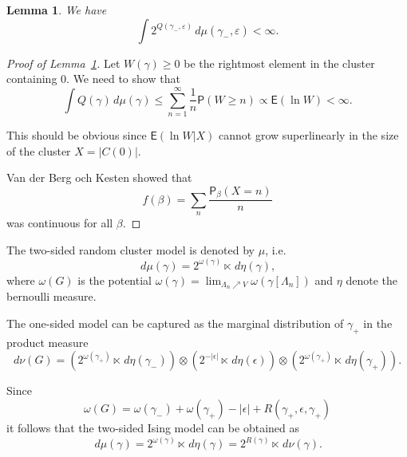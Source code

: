 \documentclass[11pt, a4paper, oneside]{article}
\newtheorem{lemma}[thm]{Lemma}
\theoremstyle{definition}
\theoremstyle{remark}
\renewcommand{\d}{\,d}
\providecommand{\E}{\mathsf{E}}
\renewcommand{\P}{\mathsf{P}}
\providecommand{\e}{\epsilon}
\providecommand{\g}{\gamma}
\providecommand{\w}{\omega}
\def\e{\varepsilon}
\begin{document}
\begin{lemma}\label{lem:Qintegrable}
  We have
  \[
    \int 2^{Q(\g_-,\e)} \d\mu(\g_-,\e) < \infty.
  \]
\end{lemma}
\begin{proof}[Proof of Lemma~\ref{lem:Qintegrable}]

  Let $W(\g)\ge 0$ be the rightmost element in the cluster containing $0$. We
  need to show that
  \[
    \int Q(\g) \d\mu(\g) \le \sum_{n=1}^\infty \frac 1n \P(W\ge n) \propto \E(\ln W ) < \infty.
  \]

  This should be obvious since $\E(\ln W|X)$ cannot grow superlinearly in the
  size of the cluster $X=|C(0)|$.

  Van der Berg och Kesten showed that
  \[
    f(\beta) = \sum_{n} \frac{\P_\beta(X=n)}{n}
  \]
  was continuous for all $\beta$.

\end{proof}






The two-sided random cluster model is denoted by $\mu$, i.e.\
$$ \d\mu(\g) = 2^{\w(\g)} \ltimes \d\eta(\g), $$
where $\w(G)$ is the potential
$\w(\g) = \lim_{\Lambda_n\nearrow V} \w(\g[\Lambda_n])$ and $\eta$ denote the
bernoulli measure.

The one-sided model can be captured as the marginal distribution of $\gamma_+$
in the product measure
\[
  d\nu(G) = (2^{\w(\g_+)} \ltimes \d\eta(\gamma_-)) \otimes (2^{-|\epsilon|} \ltimes \d\eta(\epsilon)) \otimes (2^{\w(\g_+)} \ltimes \d\eta(\g_+)).
\]

Since
\[
  \w(G) = \w(\g_-) + \w(\g_+) - |\epsilon| + R(\g_+,\epsilon,\g_+)
\]
it follows that the two-sided Ising model can be obtained as
\[
  \d\mu(\g) = 2^{\w(\g)} \ltimes \d\eta(\g) = 2^{R(\g)} \ltimes \d\nu(\g).
\]
\end{document}
